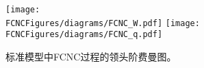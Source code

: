 
\begin{figure}[htb]
\centering
\texttt{[image: \\FCNCFigures/diagrams/FCNC\_W.pdf]}
\texttt{[image: \\FCNCFigures/diagrams/FCNC\_q.pdf]}\\
\caption{标准模型中FCNC过程的领头阶费曼图。}
\label{fig:SMFCNC}
\end{figure}